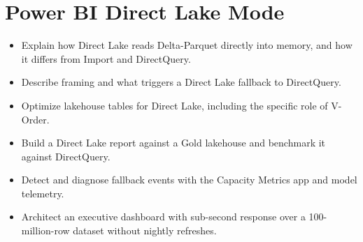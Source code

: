 \chapter{Power BI Direct Lake Mode}
%

\begin{objectives}
\begin{itemize}
    \item Explain how Direct Lake reads Delta-Parquet directly into memory, and how it differs from Import and DirectQuery.
    \item Describe framing and what triggers a Direct Lake fallback to DirectQuery.
    \item Optimize lakehouse tables for Direct Lake, including the specific role of V-Order.
    \item Build a Direct Lake report against a Gold lakehouse and benchmark it against DirectQuery.
    \item Detect and diagnose fallback events with the Capacity Metrics app and model telemetry.
    \item Architect an executive dashboard with sub-second response over a 100-million-row dataset without nightly refreshes.
\end{itemize}
\end{objectives}

